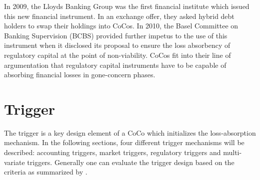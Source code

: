 In 2009, the Lloyds Banking Group was the first financial institute which issued this new financial instrument. In an exchange offer, they asked hybrid debt holders to swap their holdings into CoCos. \citep{de2011pricing} In 2010, the Basel Committee on Banking Supervision (BCBS) provided further impetus to the use of this instrument when it disclosed its proposal to ensure the loss absorbency of regulatory capital at the point of non-viability. CoCos fit into their line of  argumentation that regulatory capital instruments have to be capable of absorbing financial losses in gone-concern phases. \citep{basel2010proposal}



\section{Trigger} \label{triggermechanism}

The trigger is a key design element of a CoCo which initializes the loss-absorption mechanism. In the following sections, four different trigger mechanisms will be described: accounting triggers, market triggers, regulatory triggers and multi-variate triggers. Generally one can evaluate the trigger design based on the criteria as summarized by \citet{erismann2015pricing}. %

